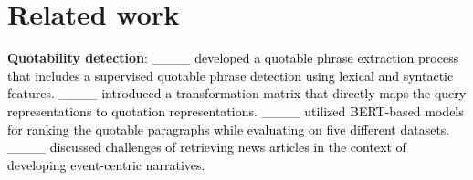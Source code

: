 \section{Related work}
\noindent\textbf{Quotability detection}:
\textcolor{black}{____ developed a quotable phrase extraction process that includes a supervised quotable phrase detection using lexical and syntactic features. ____ introduced a transformation matrix that directly maps the query representations to quotation representations. ____ utilized BERT-based models for ranking the quotable paragraphs while evaluating on five different datasets. ____ discussed challenges of retrieving news articles in the context of developing event-centric narratives.} 

